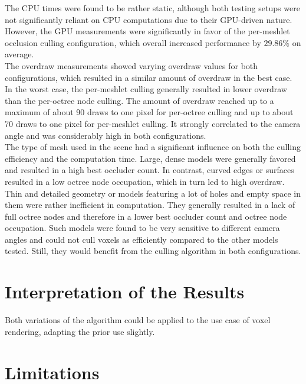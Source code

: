 \noindent
The \ac{CPU} times were found to be rather static, although both testing setups were not significantly reliant 
on \ac{CPU} computations due to their \ac{GPU}-driven nature. However, the \ac{GPU} measurements were significantly 
in favor of the per-meshlet occlusion culling configuration, which overall increased performance by $29.86\%$ on 
average. \\

\noindent
The overdraw measurements showed varying overdraw values for both configurations, which resulted in a similar amount 
of overdraw in the best case. In the worst case, the per-meshlet culling generally resulted in lower overdraw than 
the per-octree node culling. The amount of overdraw reached up to a maximum of about 90 draws to one pixel for 
per-octree culling and up to about 70 draws to one pixel for per-meshlet culling. It strongly correlated to the 
camera angle and was considerably high in both configurations. \\ 

\noindent
The type of mesh used in the scene had a significant influence on both the culling efficiency and the computation time.
Large, dense models were generally favored and resulted in a high best occluder count. In contrast, curved edges or 
surfaces resulted in a low octree node occupation, which in turn led to high overdraw. Thin and detailed geometry or 
models featuring a lot of holes and empty space in them were rather inefficient in computation. They generally resulted 
in a lack of full octree nodes and therefore in a lower best occluder count and octree node occupation. Such models 
were found to be very sensitive to different camera angles and could not cull voxels as efficiently compared to the 
other models tested. Still, they would benefit from the culling algorithm in both configurations.

\section{Interpretation of the Results}

Both variations of the algorithm could be applied to the use case of voxel rendering, adapting the prior use 
slightly.



\section{Limitations}

